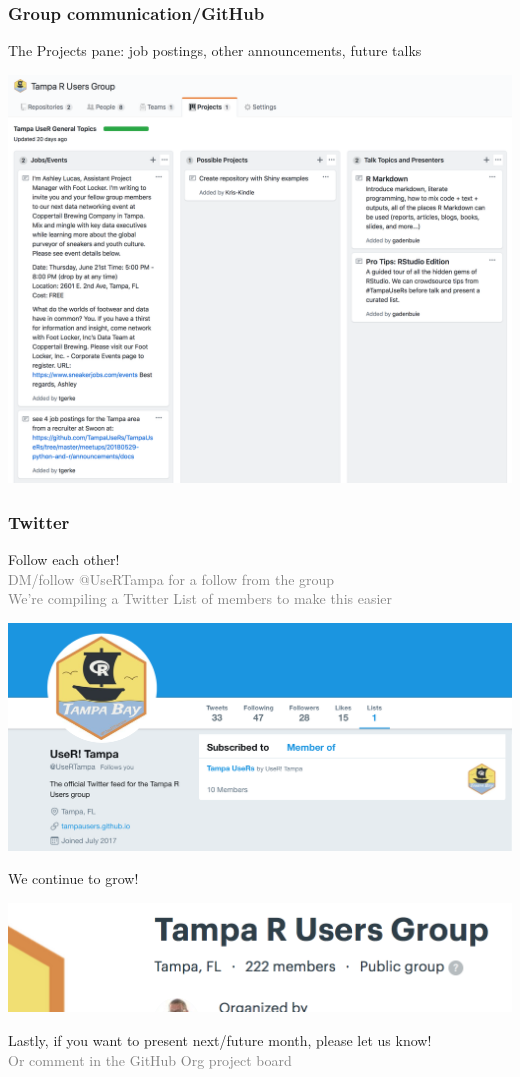 \documentclass{beamer}
\newcommand{\si}[1]{\hspace{.5cm} \textcolor{gray} {#1}\\}
\begin{document}
{\begin{frame}[t]
\frametitle{Group communication/GitHub}
The Projects pane: job postings, other announcements, future talks\\
\begin{center}
\includegraphics[scale=.25, trim=0 0 0 1cm]{figures/projectpage.png}
\end{center}
\end{frame}

\begin{frame}[t]
\frametitle{Twitter}
Follow each other! \\
\si{DM/follow @UseRTampa for a follow from the group}
\si{We're compiling a Twitter List of members to make this easier}
\begin{center}
\includegraphics[scale=.2, trim=0 .5cm 0 .5cm]{figures/twitterlist.png}
\end{center}
We continue to grow!\\
\begin{center}
\includegraphics[scale=.25, trim=0 .5cm 0 0]{figures/members.png}
\end{center}
Lastly, if you want to present next/future month, please let us know!\\
\si{Or comment in the GitHub Org project board}
\end{frame}
}
\end{document}
